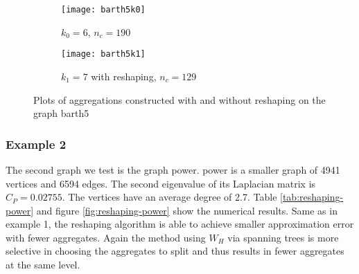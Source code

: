\documentclass[ ]{elsarticle}
\newcommand{\esp}{W}
\numberwithin{equation}{section}
\begin{document}
\begin{figure}
  \centering
  \begin{subfigure}{0.49\textwidth}
    \centering
    \texttt{[image: barth5k0]}
    \caption{$k_0=6$, $n_c=190$}
  \end{subfigure}
  \begin{subfigure}{0.49\textwidth}
    \centering
    \texttt{[image: barth5k1]}
    \caption{$k_1=7$ with reshaping, $n_c=129$}
    \label{fig:reshaping2}
  \end{subfigure}
  \caption{Plots of aggregations constructed with and without
    reshaping on the graph barth5}
  \label{fig:reshaping-barth5}
\end{figure}

\subsubsection*{\textbf{Example 2}}
The second graph we test is the graph power. power is a smaller graph
of 4941 vertices and 6594 edges. The second eigenvalue of its
Laplacian matrix is $C_P=0.02755$. The vertices have an average degree
of 2.7. Table \ref{tab:reshaping-power} and figure
\ref{fig:reshaping-power} show the numerical results. Same as in
example 1, the reshaping algorithm is able to achieve smaller
approximation error with fewer aggregates. Again the method using
$\esp_H$ via spanning trees is more selective in choosing the
aggregates to split and thus results in fewer aggregates at the same
level.
\end{document}
